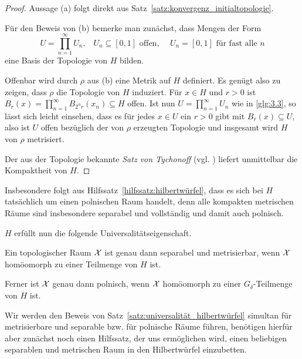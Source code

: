 \documentclass[../thesis/thesis.tex]{subfiles}
\begin{document}
	\begin{proof}
		Aussage (a) folgt direkt aus Satz~\ref{satz:konvergenz_initialtopologie}.
		
		Für den Beweis von (b) bemerke man zunächst, dass Mengen der Form 
		\[U = \prod_{n=1}^{\infty} U_n\text{,} \quad U_n \subseteq [0, 1] \text{ offen, }
		\quad U_n = [0, 1] \text{ für fast alle } n \label{glg:3.3} \tag{3.3}\]
		eine Basis der Topologie von $H$ bilden.
		
		Offenbar wird durch $\rho$ aus (b) eine Metrik auf $H$ definiert. 
		Es genügt also zu zeigen, dass $\rho$ die Topologie von $H$ induziert. 
		Für $x \in H$ und $r > 0$ ist 
		$B_r(x) = \prod_{n=1}^{\infty} B_{2^n r}(x_n) \subseteq H$ 
		offen. Ist nun $U = \prod_{n=1}^{\infty} U_n$ wie in \eqref{glg:3.3}, 
		so lässt sich leicht einsehen, dass es für jedes $x \in U$ ein $r > 0$ 
		gibt mit $B_r(x) \subseteq U$, also ist $U$ offen bezüglich der von $\rho$ 
		erzeugten Topologie und insgesamt wird $H$ von $\rho$ metrisiert.
		
		Der aus der Topologie bekannte \emph{Satz von Tychonoff} (vgl. \cite[Satz 2.7.1]{Simon.2015}) liefert 
		unmittelbar die Kompaktheit von $H$.
	\end{proof}
	
	\begin{Bemerkung}
		Insbesondere folgt aus Hilfssatz~\ref{hilfssatz:hilbertwürfel}, dass es sich bei $H$ tatsächlich um einen polnischen Raum handelt, 
		denn alle kompakten metrischen Räume sind insbesondere 
		separabel und vollständig und damit auch polnisch.
	\end{Bemerkung}
	
	$H$ erfüllt nun die folgende Universalitätseigenschaft.
	
	\begin{Satz}
		\label{satz:universalität_hilbertwürfel}
		Ein topologischer Raum $\mathcal{X}$ ist genau dann separabel und metrisierbar, wenn $\mathcal{X}$ homöomorph zu einer Teilmenge von $H$ ist.
		
		Ferner ist $\mathcal{X}$ genau dann polnisch, wenn $\mathcal{X}$ homöomorph zu einer $G_\delta$-Teilmenge von $H$ ist.
	\end{Satz}
	
	Wir werden den Beweis von Satz~\ref{satz:universalität_hilbertwürfel} simultan für metrisierbare und 
	separable bzw. für polnische Räume führen, benötigen hierfür aber zunächst noch einen Hilfssatz, der uns ermöglichen wird, 
	einen beliebigen separablen und metrischen Raum in den Hilbertwürfel einzubetten.
	
\end{document}
